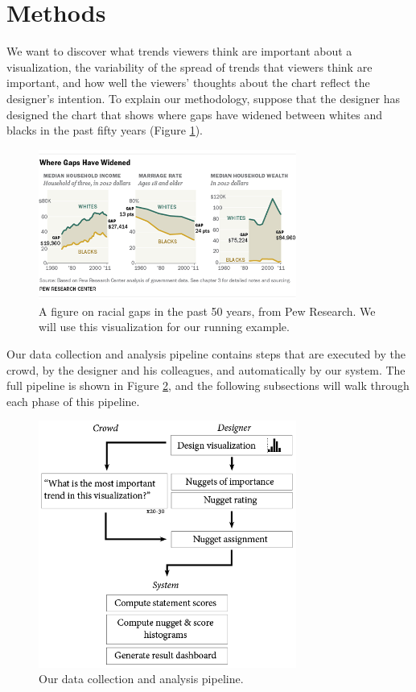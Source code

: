 \documentclass{sigchi}
\begin{document}
\section{Methods}

We want to discover what trends viewers think are important about a
visualization, the variability of the spread of trends that viewers
think are important, and how well the viewers' thoughts about the
chart reflect the designer's intention. To explain our methodology,
suppose that the designer has designed the chart that shows where gaps
have widened between whites and blacks in the past fifty years (Figure
\ref{fig:racialgaps}).

\begin{figure}[t]
  \begin{center}
    \includegraphics[width=3.33in]{figures/racialgaps.png}
  \end{center}
  \caption{A figure on racial gaps in the past 50 years, from Pew Research. We will use this visualization for our running example.}
  \label{fig:racialgaps}
\end{figure}

Our data collection and analysis pipeline contains steps that are
executed by the crowd, by the designer and his colleagues, and
automatically by our system. The full pipeline is shown in Figure
\ref{fig:pipeline}, and the following subsections will walk through
each phase of this pipeline.

\begin{figure}[t]
  \begin{center}
    \includegraphics[width=3.33in]{figures/pipeline.png}
  \end{center}
  \caption{Our data collection and analysis pipeline.}
  \label{fig:pipeline}
\end{figure}
\end{document}
